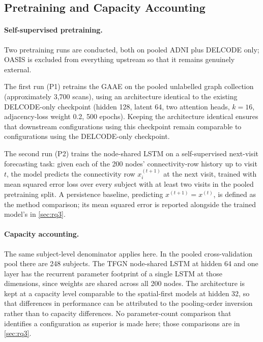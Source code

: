 \subsection{Pretraining and Capacity Accounting}\label{sec:tfgn-pretraining}

\paragraph{Self-supervised pretraining.}
Two pretraining runs are conducted, both on pooled \ac{ADNI} plus \ac{DELCODE} only;
\ac{OASIS} is excluded from everything upstream so that it remains genuinely external.

The first run (P1) retrains the \ac{GAAE} on the pooled unlabelled graph collection
(approximately 3,700 scans), using an architecture identical to the existing
\ac{DELCODE}-only checkpoint (hidden 128, latent 64, two attention heads, $k = 16$,
adjacency-loss weight 0.2, 500 epochs). Keeping the architecture identical ensures that
downstream configurations using this checkpoint remain comparable to configurations using the \ac{DELCODE}-only
checkpoint.

The second run (P2) trains the node-shared \ac{LSTM} on a self-supervised next-visit
forecasting task: given each of the 200 nodes' connectivity-row history up to visit $t$,
the model predicts the connectivity row $x_i^{(t+1)}$ at the next visit, trained with mean
squared error loss over every subject with at least two visits in the pooled pretraining
split. A persistence baseline, predicting $x^{(t+1)} = x^{(t)}$, is defined as the method
comparison; its mean squared error is reported alongside the trained model's in
\autoref{sec:rq3}.

\paragraph{Capacity accounting.}
The same subject-level denominator applies here. In the pooled cross-validation pool there
are 248 subjects. The \ac{TFGN} node-shared \ac{LSTM} at hidden 64 and one layer has the
recurrent parameter footprint of a single \ac{LSTM} at those dimensions, since weights are
shared across all 200 nodes. The architecture is kept at a capacity level comparable to
the spatial-first models at hidden 32, so that differences in performance can be attributed
to the pooling-order inversion rather than to capacity differences. No parameter-count
comparison that identifies a configuration as superior is made here; those comparisons are
in \autoref{sec:rq3}.

